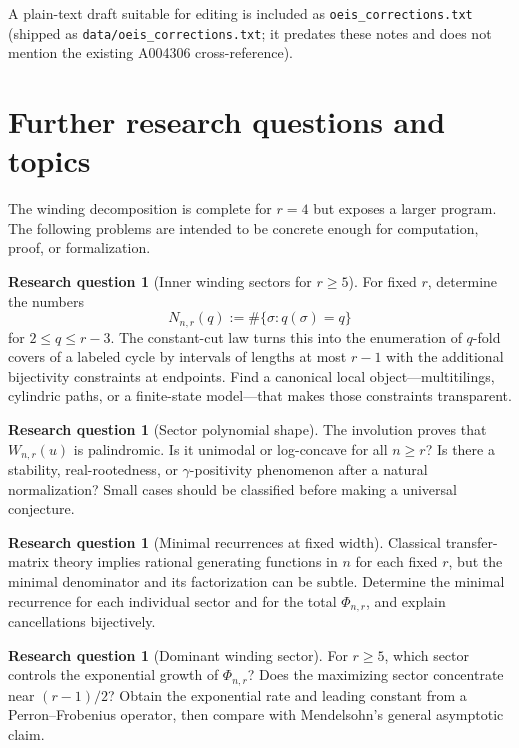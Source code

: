 \documentclass[11pt,letterpaper]{article}
\newcommand{\file}[1]{\nolinkurl{#1}}
\numberwithin{equation}{section}
\theoremstyle{definition}
\newtheorem{question}[theorem]{Research question}
\begin{document}
A plain-text draft suitable for editing is included as
\file{oeis_corrections.txt} (shipped as
\file{data/oeis_corrections.txt}; it predates these notes and does not
mention the existing A004306 cross-reference).

\section{Further research questions and topics}\label{wdc:sec:further}

The winding decomposition is complete for $r=4$ but exposes a larger program.
The following problems are intended to be concrete enough for computation,
proof, or formalization.

\begin{question}[Inner winding sectors for $r\ge5$]
For fixed $r$, determine the numbers
\[
  N_{n,r}(q):=\#\{\sigma:q(\sigma)=q\}
\]
for $2\le q\le r-3$.  The constant-cut law turns this into the enumeration of
$q$-fold covers of a labeled cycle by intervals of lengths at most $r-1$ with
the additional bijectivity constraints at endpoints.  Find a canonical local
object---multitilings, cylindric paths, or a finite-state model---that makes
those constraints transparent.
\end{question}

\begin{question}[Sector polynomial shape]
The involution proves that $W_{n,r}(u)$ is palindromic.  Is it unimodal or
log-concave for all $n\ge r$?  Is there a stability, real-rootedness, or
$\gamma$-positivity phenomenon after a natural normalization?  Small cases
should be classified before making a universal conjecture.
\end{question}

\begin{question}[Minimal recurrences at fixed width]
Classical transfer-matrix theory implies rational generating functions in $n$
for each fixed $r$, but the minimal denominator and its factorization can be
subtle.  Determine the minimal recurrence for each individual sector and for
the total $\Phi_{n,r}$, and explain cancellations bijectively.
\end{question}

\begin{question}[Dominant winding sector]
For $r\ge5$, which sector controls the exponential growth of $\Phi_{n,r}$?
Does the maximizing sector concentrate near $(r-1)/2$?  Obtain the exponential
rate and leading constant from a Perron--Frobenius operator, then compare with
Mendelsohn's general asymptotic claim.
\end{question}
\end{document}
